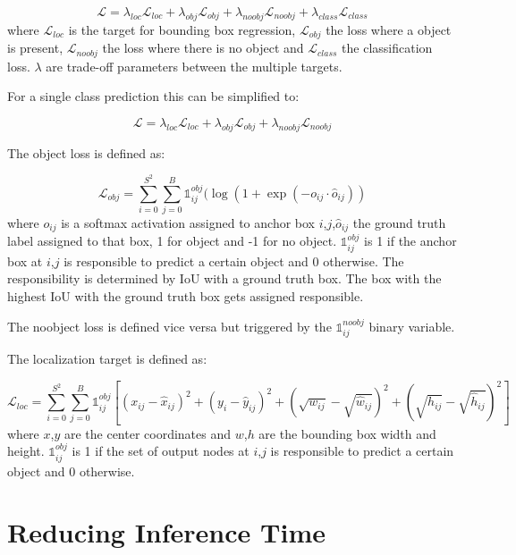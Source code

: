 	\begin{equation}
	\mathcal{L} = \lambda_{loc}\mathcal{L}_{loc} + \lambda_{obj}\mathcal{L}_{obj} + \lambda_{noobj}\mathcal{L}_{noobj} + \lambda_{class}\mathcal{L}_{class}
	\end{equation}
	where $\mathcal{L}_{loc}$ is the target for bounding box regression, $\mathcal{L}_{obj}$ the loss where a object is present, $\mathcal{L}_{noobj}$ the loss where there is no object and $\mathcal{L}_{class}$ the classification loss. $\lambda$ are trade-off parameters between the multiple targets.
	
	For a single class prediction this can be simplified to:
	
	\begin{equation}
	\mathcal{L} = \lambda_{loc}\mathcal{L}_{loc} + \lambda_{obj}\mathcal{L}_{obj} + \lambda_{noobj}\mathcal{L}_{noobj}
	\end{equation}
	
	The object loss is defined as:
	
	\begin{equation}
		\mathcal{L}_{obj} = \sum_{i=0}^{S^2}\sum_{j=0}^B \mathbb{1}_{ij}^{obj}(\log(1+\exp(-o_{ij} \cdot \hat o_{ij}))
	\end{equation}
	where $o_{ij}$ is a softmax activation assigned to anchor box $i$,$j$,$\hat o_{ij}$ the ground truth label assigned to that box, 1 for object and -1 for no object.  $\mathbb{1}_{ij}^{obj}$ is 1 if the anchor box at $i$,$j$ is responsible to predict a certain object and 0 otherwise. The responsibility is determined by \ac{IoU} with a ground truth box. The box with the highest \ac{IoU} with the ground truth box gets assigned responsible.
	
	The noobject loss is defined vice versa but triggered by the $\mathbb{1}_{ij}^{noobj}$ binary variable.
	
	The localization target is defined as:
	
	\begin{equation}
		\mathcal{L}_{loc} = \sum_{i=0}^{S^2}\sum_{j=0}^B \mathbb{1}_{ij}^{obj}[(x_{ij}-\hat{x}_{ij})^2 + (y_i-\hat{y}_{ij})^2  + (\sqrt{w_{ij}}-\sqrt{\hat{w}_{ij}})^2 +(\sqrt{h_{ij}}-\sqrt{\hat{h}_{ij}})^2 ]
	\end{equation}
	where $x$,$y$ are the center coordinates and $w$,$h$ are the bounding box width and height. $\mathbb{1}_{ij}^{obj}$ is 1 if the set of output nodes at $i$,$j$ is responsible to predict a certain object and 0 otherwise. 
	
	\section{Reducing Inference Time}
	

